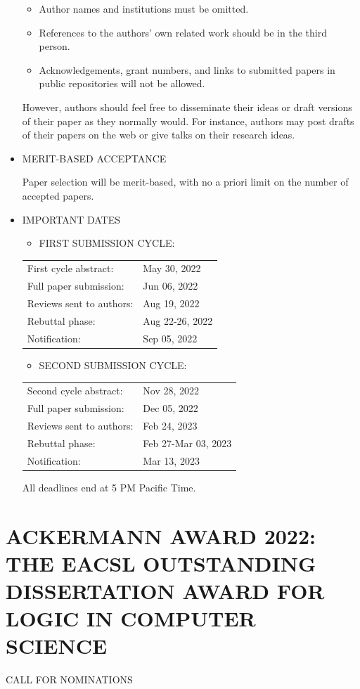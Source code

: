 \documentclass[prodmode,acmtecs]{acmsmall} %
\begin{document}
\begin{itemize}
\begin{itemize}\item  Author names and institutions must be omitted.
\item  References to the authors’ own related work should be in the third person. 
\item  Acknowledgements, grant numbers, and links to submitted papers in public repositories will not be allowed.
\end{itemize} 
  However, authors should feel free to disseminate their ideas or draft versions of their paper as they normally would. For instance, authors may post drafts of their papers on the web or give talks on their research ideas. 
 
\item  MERIT-BASED ACCEPTANCE 
 
  Paper selection will be merit-based, with no a priori limit on the number of accepted papers. 
 
\item  IMPORTANT DATES 
 
\begin{itemize}\item  FIRST SUBMISSION CYCLE:
\end{itemize} 
\begin{tabulary}{\linewidth}{LL}First cycle abstract:  & May 30, 2022 \\
Full paper submission:  & Jun 06, 2022 \\
Reviews sent to authors:  & Aug 19, 2022 \\
Rebuttal phase:  & Aug 22-26, 2022 \\
Notification:  & Sep 05, 2022 \\
\end{tabulary}
 
\begin{itemize}\item  SECOND SUBMISSION CYCLE:
\end{itemize} 
\begin{tabulary}{\linewidth}{LL}Second cycle abstract:  & Nov 28, 2022 \\
Full paper submission:  & Dec 05, 2022 \\
Reviews sent to authors:  & Feb 24, 2023 \\
Rebuttal phase:  & Feb 27-Mar 03, 2023 \\
Notification:  & Mar 13, 2023 \\
\end{tabulary}
 
  All deadlines end at 5 PM Pacific Time. 
 
\end{itemize}\section{ACKERMANN AWARD 2022: THE EACSL OUTSTANDING DISSERTATION AWARD FOR LOGIC IN COMPUTER SCIENCE}\label{ACKERMANNAWARD2022}CALL FOR NOMINATIONS 
\end{document}
